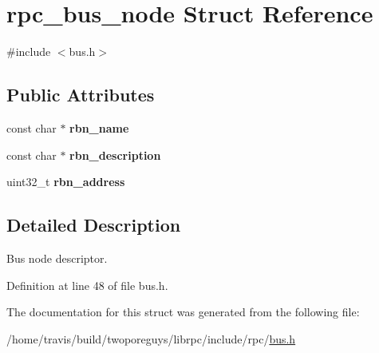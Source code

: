 \hypertarget{structrpc__bus__node}{\section{rpc\-\_\-bus\-\_\-node Struct Reference}
\label{structrpc__bus__node}
}


{\ttfamily \#include $<$bus.\-h$>$}

\subsection*{Public Attributes}
\begin{DoxyCompactItemize}
\item 
\hypertarget{structrpc__bus__node_a7fa4491eff39bb96c779b4208ca388ec}{const char $\ast$ {\bfseries rbn\-\_\-name}}\label{structrpc__bus__node_a7fa4491eff39bb96c779b4208ca388ec}

\item 
\hypertarget{structrpc__bus__node_aa7eab44be63bee011e2b7589a092a3ab}{const char $\ast$ {\bfseries rbn\-\_\-description}}\label{structrpc__bus__node_aa7eab44be63bee011e2b7589a092a3ab}

\item 
\hypertarget{structrpc__bus__node_a624e2a0be665938924ab2f815afb669e}{uint32\-\_\-t {\bfseries rbn\-\_\-address}}\label{structrpc__bus__node_a624e2a0be665938924ab2f815afb669e}

\end{DoxyCompactItemize}


\subsection{Detailed Description}
Bus node descriptor. 

Definition at line 48 of file bus.\-h.



The documentation for this struct was generated from the following file\-:\begin{DoxyCompactItemize}
\item 
/home/travis/build/twoporeguys/librpc/include/rpc/\hyperlink{bus_8h}{bus.\-h}\end{DoxyCompactItemize}
